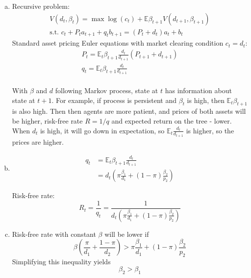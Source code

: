 \documentclass{article}
\newcommand{\E}{\mathbb{E}}
\begin{document}
\begin{enumerate}[(a)]
\item Recursive problem:
  \begin{gather*}
    V(d_t,\beta_t)=\max \log(c_t)+\E\beta_{t+1}V(d_{t+1},\beta_{t+1})\\
    \text{s.t. } c_t+P_ta_{t+1}+q_tb_{t+1}=(P_t+d_t)a_t+b_t
  \end{gather*}
Standard asset pricing Euler equations with  market clearing condition $c_t=d_t$:
  \begin{gather*}
    P_t=\E_t\beta_{t+1}\frac{d_t}{d_{t+1}}(P_{t+1}+d_{t+1})\\
    q_t=\E_t\beta_{t+1}\frac{d_t}{d_{t+1}}\\
  \end{gather*}

  With $\beta$ and $d$ following Markov process, state at $t$ has
  information about state at $t+1$. For example, if process is
  persistent and $\beta_t$ is high, then $\E_t\beta_{t+1}$ is also
  high. Then then agents are more patient, and prices of both assets
  will be higher, risk-free rate $R=1/q$ and expected return on the tree -
  lower. When $d_t$ is high, it will go down in expectation, so
  $\E_t\frac{d_t}{d_{t+1}}$ is higher, so the prices are higher.

  \item 
    \begin{align*}
      q_t&=\E_t\beta_{t+1}\frac{d_t}{d_{t+1}}\\
         &=d_t\left(\pi\frac{\beta_1}{d_1}+(1-\pi)\frac{\beta_2}{p_2}\right)
    \end{align*}

    Risk-free rate:
    \begin{equation*}
      R_t = \frac{1}{q_t}=\frac{1}{d_t\left(\pi\frac{\beta_1}{d_1}+(1-\pi)\frac{\beta_2}{p_2}\right)}
    \end{equation*}

  \item Risk-free rate with constant $\beta$ will be lower if
    \begin{equation*}
      \beta(\frac{\pi}{d_1}+\frac{1-\pi}{d_2})>\pi\frac{\beta_1}{d_1}+(1-\pi)\frac{\beta_2}{p_2}
    \end{equation*}
    Simplifying this inequality yields
    \begin{equation*}
      \beta_2>\beta_1
    \end{equation*}

\end{enumerate}
\end{document}
